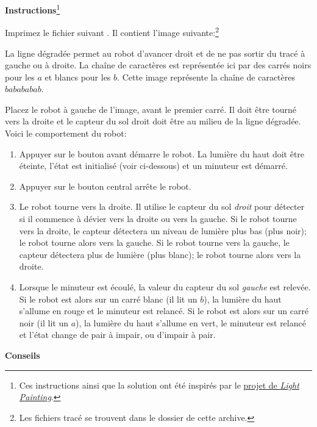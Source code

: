\textbf{Instructions}\footnote{Ces instructions ainsi que la solution ont été inspirés par
le \href{https://www.thymio.org/fr:barcodelightpainting}{projet de \textit{Light Painting}}.}

Imprimez le fichier suivant .
Il contient l'image suivante:\footnote{Les fichiers tracé se trouvent dans le dossier  de cette archive.}


La ligne dégradée permet au robot d'avancer droit et de ne pas sortir du tracé à gauche ou à droite.
La chaîne de caractères est représentée ici par des carrés noirs pour les $a$ et blancs pour les $b$.
Cette image représente la chaîne de caractères $babababab$.

Placez le robot à gauche de l'image, avant le premier carré.
Il doit être tourné vers la droite et le capteur du sol droit doit être au milieu de la ligne dégradée.
Voici le comportement du robot:

\begin{enumerate}

\item Appuyer sur le bouton avant démarre le robot. La lumière du haut doit être éteinte,
l'état est initialisé (voir ci-dessous) et un minuteur est démarré.

\item Appuyer sur le bouton central arrête le robot.

\item Le robot tourne vers la droite.
Il utilise le capteur du sol \emph{droit} pour détecter si il commence à dévier vers la droite ou
vers la gauche.
Si le robot tourne vers la droite, le capteur détectera un niveau de lumière plus bas (plus noir);
le robot tourne alors vers la gauche.
Si le robot tourne vers la gauche, le capteur détectera plus de lumière (plus blanc);
le robot tourne alors vers la droite.

\item Lorsque le minuteur est écoulé, la valeur du capteur du sol \emph{gauche} est relevée.
Si le robot est alors sur un carré blanc (il lit un $b$), la lumière du haut s'allume en rouge
et le minuteur est relancé.
Si le robot est alors sur un carré noir (il lit un $a$), la lumière du haut s'allume en vert,
le minuteur est relancé et l'état change de pair à impair, ou d'impair à pair.

\end{enumerate}

\textbf{Conseils}

